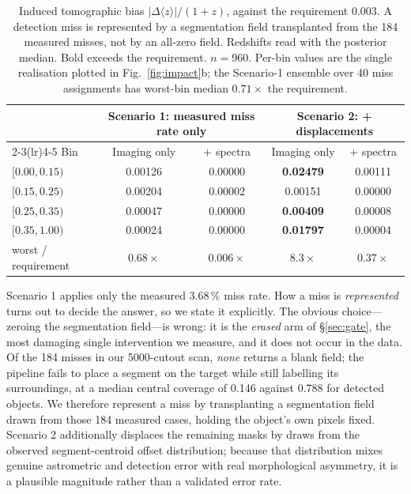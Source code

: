 \documentclass[11pt]{article}
\newcommand{\dzreq}{|\Delta\langle z\rangle|/(1+z)}
\begin{document}
\begin{table}[t]
\centering\small
\caption{Induced tomographic bias $\dzreq$, against the requirement 0.003. A detection miss is
represented by a segmentation field transplanted from the 184 measured misses, not by an
all-zero field. Redshifts read with the posterior median. Bold exceeds the requirement. $n=960$.
Per-bin values are the single realisation plotted in Fig.~\ref{fig:impact}b; the Scenario-1
ensemble over 40 miss assignments has worst-bin median $0.71\times$ the requirement.}
\label{tab:tomo}
\begin{tabular}{lcccc}
\toprule
& \multicolumn{2}{c}{Scenario 1: measured miss rate only} & \multicolumn{2}{c}{Scenario 2: + displacements} \\
\cmidrule(lr){2-3}\cmidrule(lr){4-5}
Bin & Imaging only & + spectra & Imaging only & + spectra \\
\midrule
$[0.00,0.15)$ & 0.00126 & 0.00000 & \textbf{0.02479} & 0.00111 \\
$[0.15,0.25)$ & 0.00204 & 0.00002 & 0.00151 & 0.00000 \\
$[0.25,0.35)$ & 0.00047 & 0.00000 & \textbf{0.00409} & 0.00008 \\
$[0.35,1.00)$ & 0.00024 & 0.00000 & \textbf{0.01797} & 0.00004 \\
\midrule
worst / requirement & $0.68\times$ & $0.006\times$ & $8.3\times$ & $0.37\times$ \\
\bottomrule
\end{tabular}
\end{table}

Scenario 1 applies only the measured 3.68\,\% miss rate. How a miss is \emph{represented}
turns out to decide the answer, so we state it explicitly. The obvious choice---zeroing the
segmentation field---is wrong: it is the \emph{erased} arm of \S\ref{sec:gate}, the most
damaging single intervention we measure, and it does not occur in the data. Of the 184 misses
in our 5000-cutout scan, \emph{none} returns a blank field; the pipeline fails to place a
segment on the target while still labelling its surroundings, at a median central coverage of
0.146 against 0.788 for detected objects. We therefore represent a miss by transplanting a
segmentation field drawn from those 184 measured cases, holding the object's own pixels fixed.
Scenario 2 additionally displaces the remaining masks by draws from the observed
segment-centroid offset distribution; because that distribution mixes genuine astrometric and
detection error with real morphological asymmetry, it is a plausible magnitude rather than a
validated error rate.
\end{document}
